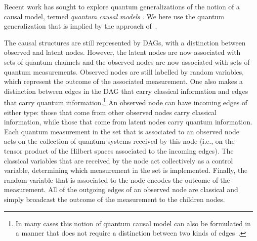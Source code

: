 \documentclass[aps,english,superscriptaddress,onecolumn,twoside,longbibliography,pra,floatfix,fleqn,nofootinbib]{revtex4-1}%
\theoremstyle{definition}
\begin{document}
Recent work has sought to explore quantum generalizations of the notion of a causal model, termed {\em quantum causal models} \cite{leifer2013conditionalstates,pusey2014gdag,BeyondBellII,Chaves2015infoquantum,ried2015quantum}. 
We here use 
the quantum generalization that is implied by the approach of~\cite{pusey2014gdag}.

The causal structures are still represented by DAGs, with a distinction between observed and latent nodes.  However, the latent nodes are now associated with sets of quantum channels and the observed nodes are now associated with sets of quantum  measurements.  Observed nodes are still labelled by random variables, which represent the outcome of the associated measurement. 
One also makes a distinction between edges in the DAG that carry classical information and edges that carry quantum information.\footnote{In many
cases this notion of quantum causal model can also be formulated in a manner that does not require a distinction between two kinds of edges~\cite{BeyondBellII}.} 
 An observed node can have incoming edges of either type: 
those that come from other observed nodes carry classical information, while those that come from latent nodes carry quantum information.  Each quantum measurement in the set that is associated to an observed node acts on the collection of quantum systems received by this node (i.e., on the tensor product of the Hilbert spaces associated to the incoming edges).  The classical variables that are received by the node act collectively as a control variable, determining which measurement in the set is implemented.  Finally, the random variable that is associated to the node encodes the outcome of the measurement.  All of the outgoing edges of an observed node are classical and simply broadcast the outcome of the measurement to the children nodes. 
\end{document}
